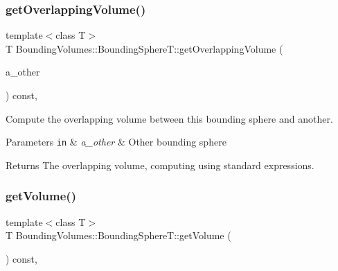 \subsubsection{\texorpdfstring{get\+Overlapping\+Volume()}{getOverlappingVolume()}}
{\footnotesize\ttfamily template$<$class T$>$ \\
T Bounding\+Volumes\+::\+Bounding\+Sphere\+T\+::get\+Overlapping\+Volume (\begin{DoxyParamCaption}\item[{const \hyperlink{classEBGeometry_1_1BoundingVolumes_1_1BoundingSphereT}{Bounding\+SphereT}$<$ T $>$ \&}]{a\+\_\+other }\end{DoxyParamCaption}) const\hspace{0.3cm}{\ttfamily [inline]}, {\ttfamily [noexcept]}}



Compute the overlapping volume between this bounding sphere and another. 


\begin{DoxyParams}[1]{Parameters}
\mbox{\tt in}  & {\em a\+\_\+other} & Other bounding sphere \\
\hline
\end{DoxyParams}
\begin{DoxyReturn}{Returns}
The overlapping volume, computing using standard expressions. 
\end{DoxyReturn}
\mbox{\label{classEBGeometry_1_1BoundingVolumes_1_1BoundingSphereT_a9289fa08e9cf3d0f6e7e0fb5556233f5}} 
\subsubsection{\texorpdfstring{get\+Volume()}{getVolume()}}
{\footnotesize\ttfamily template$<$class T$>$ \\
T Bounding\+Volumes\+::\+Bounding\+Sphere\+T\+::get\+Volume (\begin{DoxyParamCaption}{ }\end{DoxyParamCaption}) const\hspace{0.3cm}{\ttfamily [inline]}, {\ttfamily [noexcept]}}



